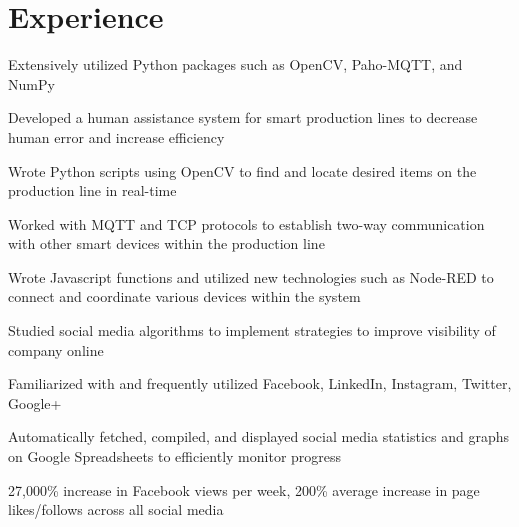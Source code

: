 \documentclass[]{resume}
\begin{document}
\begin{minipage}[t]{0.66\textwidth} 


\section{Experience}

\vspace{\topsep} %
\begin{tightemize}
\item Extensively utilized Python packages such as OpenCV, Paho-MQTT, and NumPy
\item Developed a human assistance system for smart production lines to decrease human error and increase efficiency
\item Wrote Python scripts using OpenCV to find and locate desired items on the production line in real-time
\item Worked with MQTT and TCP protocols to establish two-way communication with other smart devices within the production line
\item Wrote Javascript functions and utilized new technologies such as Node-RED to connect and coordinate various devices within the system
\end{tightemize}
\sectionsep

\vspace{\topsep} %
\begin{tightemize}
\item Studied social media algorithms to implement strategies to improve visibility of company online 
\item Familiarized with and frequently utilized Facebook, LinkedIn, Instagram, Twitter, Google+ 
\item Automatically fetched, compiled, and displayed social media statistics and graphs on Google Spreadsheets to efficiently monitor progress 
\item 27,000\% increase in Facebook views per week, 200\% average increase in page likes/follows across all social media
\end{tightemize}
\sectionsep


\end{minipage}
\end{document}

